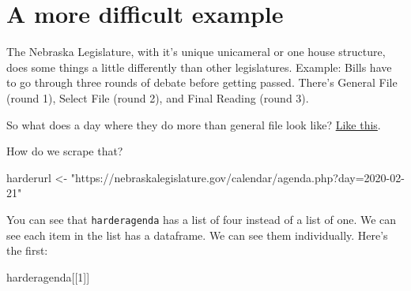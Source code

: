 \documentclass[]{book}
\newenvironment{Shaded}{\begin{snugshade}}{\end{snugshade}}
\newcommand{\DecValTok}[1]{\textcolor[rgb]{0.00,0.00,0.81}{#1}}
\newcommand{\KeywordTok}[1]{\textcolor[rgb]{0.13,0.29,0.53}{\textbf{#1}}}
\newcommand{\NormalTok}[1]{#1}
\newcommand{\OperatorTok}[1]{\textcolor[rgb]{0.81,0.36,0.00}{\textbf{#1}}}
\newcommand{\StringTok}[1]{\textcolor[rgb]{0.31,0.60,0.02}{#1}}
\begin{document}
\hypertarget{a-more-difficult-example}{%
\section{A more difficult example}\label{a-more-difficult-example}}

The Nebraska Legislature, with it's unique unicameral or one house structure, does some things a little differently than other legislatures. Example: Bills have to go through three rounds of debate before getting passed. There's General File (round 1), Select File (round 2), and Final Reading (round 3).

So what does a day where they do more than general file look like? \href{https://nebraskalegislature.gov/calendar/agenda.php?day=2020-02-21}{Like this}.

How do we scrape that?

\begin{Shaded}
\begin{Highlighting}[]
\NormalTok{harderurl <-}\StringTok{ "https://nebraskalegislature.gov/calendar/agenda.php?day=2020-02-21"}
\end{Highlighting}
\end{Shaded}

\begin{Shaded}
\end{Shaded}

You can see that \texttt{harderagenda} has a list of four instead of a list of one. We can see each item in the list has a dataframe. We can see them individually. Here's the first:

\begin{Shaded}
\begin{Highlighting}[]
\NormalTok{harderagenda[[}\DecValTok{1}\NormalTok{]]}
\end{Highlighting}
\end{Shaded}
\end{document}
